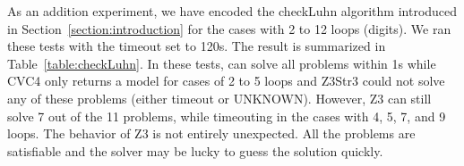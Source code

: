 

As an addition experiment, we have encoded the checkLuhn algorithm introduced in Section~\ref{section:introduction} for the cases with 2 to 12 loops (digits). We ran these tests 
with the timeout set to 120s. The result is summarized in Table~\ref{table:checkLuhn}.
In these tests, {\tool} can solve all problems within 1s while CVC4 only returns a model for cases of 2 to 5 loops and Z3Str3 could not solve any of these problems (either timeout or UNKNOWN). However, Z3 can still solve 7 out of the 11 problems, while timeouting in the cases with 4, 5, 7, and 9 loops. The behavior of Z3 is not entirely unexpected. All the problems are satisfiable and the solver may be lucky to guess the solution quickly. %

